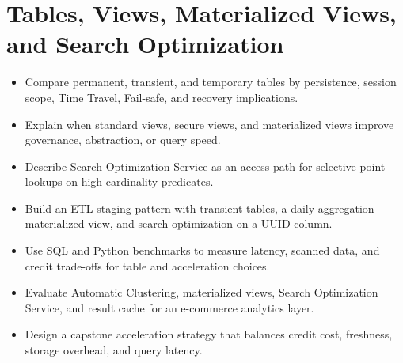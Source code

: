 \chapter{Tables, Views, Materialized Views, and Search Optimization}
%
\begin{objectives}
\begin{itemize}
    \item Compare permanent, transient, and temporary tables by persistence, session scope, Time Travel, Fail-safe, and recovery implications.
    \item Explain when standard views, secure views, and materialized views improve governance, abstraction, or query speed.
    \item Describe Search Optimization Service as an access path for selective point lookups on high-cardinality predicates.
    \item Build an ETL staging pattern with transient tables, a daily aggregation materialized view, and search optimization on a UUID column.
    \item Use SQL and Python benchmarks to measure latency, scanned data, and credit trade-offs for table and acceleration choices.
    \item Evaluate Automatic Clustering, materialized views, Search Optimization Service, and result cache for an e-commerce analytics layer.
    \item Design a capstone acceleration strategy that balances credit cost, freshness, storage overhead, and query latency.
\end{itemize}
\end{objectives}
